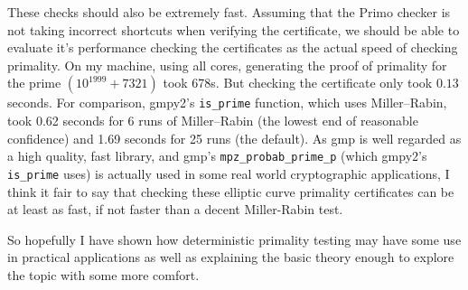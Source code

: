 \documentclass[]{article}
\begin{document}
These checks should also be extremely fast. Assuming that the Primo checker is not taking incorrect shortcuts when verifying the certificate, we should be able to evaluate it's performance checking the certificates as the actual speed of checking primality. On my machine, using all cores, generating the proof of primality for the prime $(10^{1999} + 7321)$ took 678s. But checking the certificate only took $0.13$ seconds. For comparison, gmpy2's \texttt{is\_prime} function, which uses Miller--Rabin,  took 0.62 seconds for 6 runs of Miller--Rabin (the lowest end of reasonable confidence) and 1.69 seconds for 25 runs (the default). As gmp is well regarded as a high quality, fast library, and gmp's \texttt{mpz\_probab\_prime\_p} (which gmpy2's \texttt{is\_prime} uses) is actually used in some real world cryptographic applications, I think it fair to say that checking these elliptic curve primality certificates can be at least as fast, if not faster than a decent Miller-Rabin test. 

So hopefully I have shown how deterministic primality testing may have some use in practical applications as well as explaining the basic theory enough to explore the topic with some more comfort.





\end{document}
